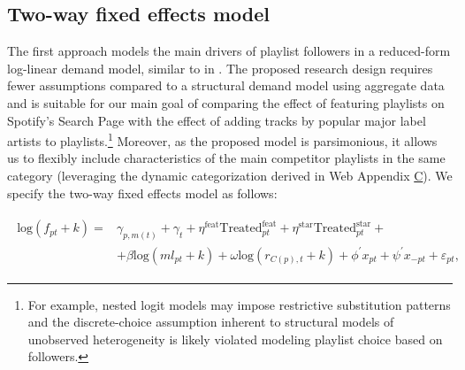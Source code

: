 \subsection{Two-way fixed effects model} 

\label{two_way_fe}

The first approach models the main drivers of playlist followers in a reduced-form log-linear demand model, similar to in \cite{shapiro_hitsch_tuchman_2021}. The proposed research design requires fewer assumptions compared to a structural demand model using aggregate data \citep[e.g.,][]{Berry1994} and is suitable for our main goal of comparing the effect of featuring playlists on Spotify's Search Page with the effect of adding tracks by popular major label artists to playlists.\footnote{For example, nested logit models may impose restrictive substitution patterns \citep[e.g.,][]{Berry1995,bresnahan_1996_RAND} and the discrete-choice assumption inherent to structural models of unobserved heterogeneity \citep[][]{Berry1995} is likely violated modeling playlist choice based on followers.} %
Moreover, as the proposed model is parsimonious, it allows us to flexibly include characteristics of the main competitor playlists in the same category (leveraging the dynamic categorization derived in Web Appendix \hyperref[details_mining]{C}). We specify the two-way fixed effects model as follows:

\begin{align} 
\begin{split} 
\text{log}(f_{pt}+k) =
& \gamma_{p,m(t)} + \gamma_t + \eta^{\text{feat}} \text{Treated}_{pt}^{\text{feat}} + \eta^{\text{star}} \text{Treated}_{pt}^{\text{star}} + \\ & + \beta \text{log}(ml_{pt}+k) + \omega \text{log}(r_{C(p),t}+k) + \phi^{\prime} x_{pt} + \psi^{\prime} x_{-pt} + \varepsilon_{pt}, 
\end{split}
\label{two_way_model}
\end{align} %

